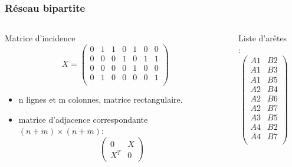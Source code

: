 \documentclass[nopagenumber,9pt]{beamer}
\begin{document}
\begin{frame}
\frametitle{Réseau bipartite}
 \begin{columns}
 \begin{column}{.35\paperwidth}
Matrice d'incidence
 $$X=\left(
\begin{array}{rrrrrrr}
  0 &   1 &   1 &   0 &   1 &   0 &   0 \\ 
  0 &   0 &   0 &   1 &   0 &   1 &   1 \\ 
  0 &   0 &   0 &   0 &   1 &   0 &   0 \\ 
  0 &   1 &   0 &   0 &   0 &   0 &   1 \\ 
\end{array}\right)
$$


\begin{itemize}
 \item n lignes et m colonnes, matrice rectangulaire.
 \item matrice d'adjacence correspondante $(n+m)\times(n+m)$:
 $$
 \left(
 \begin{array}{rr}
  0 & X\\
  X^T & 0
 \end{array}
 \right)
 $$
\end{itemize}

\end{column}

 \begin{column}{.2\paperwidth}
  Liste d'ar\^etes : 
 $$\left(
 \begin{array}{rr}
 A1 & B2 \\ 
 A1 & B3 \\ 
 A1 & B5 \\ 
 A2 & B4 \\ 
 A2 & B6 \\ 
 A2 & B7 \\ 
 A3 & B5 \\ 
 A4 & B2 \\ 
 A4 & B7 \\   
 \end{array}
 \right)$$ 
  
 \end{column}


\begin{column}{.3\paperwidth}


\end{column}
\end{columns}
\end{frame}
\end{document}
